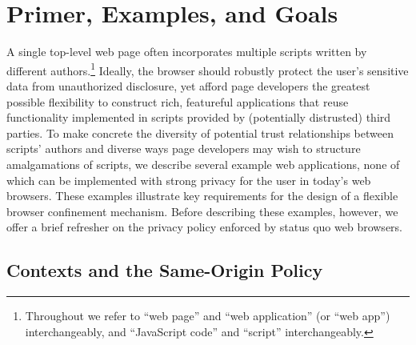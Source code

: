 \section{Primer, Examples, and Goals}

A single top-level web page often incorporates multiple scripts
written by different authors.\footnote{Throughout we refer to ``web
  page'' and ``web application'' (or ``web app'') interchangeably, and
  ``JavaScript code'' and ``script'' interchangeably.} Ideally, the
browser should robustly protect the user's sensitive data from
unauthorized disclosure, yet afford page developers the greatest
possible flexibility to construct rich, featureful applications that
reuse functionality implemented in scripts provided by (potentially
distrusted) third parties. To make concrete the diversity of potential
trust relationships between scripts' authors and diverse ways page
developers may wish to structure amalgamations of scripts, we describe
several example web applications, none of which can be implemented
with strong privacy for the user in today's web browsers. These
examples illustrate key requirements for the design of a flexible
browser confinement mechanism. Before describing these examples,
however, we offer a brief refresher on the privacy policy enforced by
status quo web browsers.

\subsection{Contexts and the Same-Origin Policy}
\label{sec:goals}


